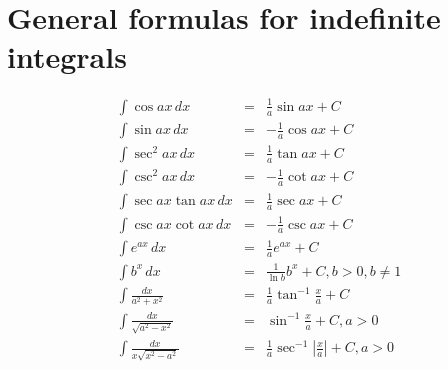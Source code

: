 \documentclass{article}
\begin{document}
\section*{General formulas for indefinite integrals}
\begin{eqnarray}
    \int{\cos{ax}\,dx} &=& \frac{1}{a}\sin{ax} + C \\
    \int{\sin{ax}\,dx} &=& -\frac{1}{a}\cos{ax} + C \\
    \int{\sec^2{ax}\,dx} &=& \frac{1}{a}\tan{ax} + C \\
    \int{\csc^2{ax}\,dx} &=& -\frac{1}{a}\cot{ax} + C \\
    \int{\sec{ax}\tan{ax}\,dx} &=& \frac{1}{a}\sec{ax} + C \\
    \int{\csc{ax}\cot{ax}\,dx} &=& -\frac{1}{a}\csc{ax} + C \\
    \int{e^{ax}\,dx} &=& \frac{1}{a}e^{ax} + C \\
    \int{b^x\,dx} &=& \frac{1}{\ln{b}}b^x + C, b > 0, b \neq 1 \\
    \int{\frac{dx}{a^2 + x^2}} &=& \frac{1}{a}\tan^{-1}{\frac{x}{a}} + C \\
    \int{\frac{dx}{\sqrt{a^2 - x^2}}} &=& \sin^{-1}{\frac{x}{a}} + C, a > 0 \\
    \int{\frac{dx}{x\sqrt{x^2 - a^2}}} &=& \frac{1}{a}\sec^{-1}{\left|\frac{x}{a}\right|} + C, a > 0
\end{eqnarray}
\end{document}
